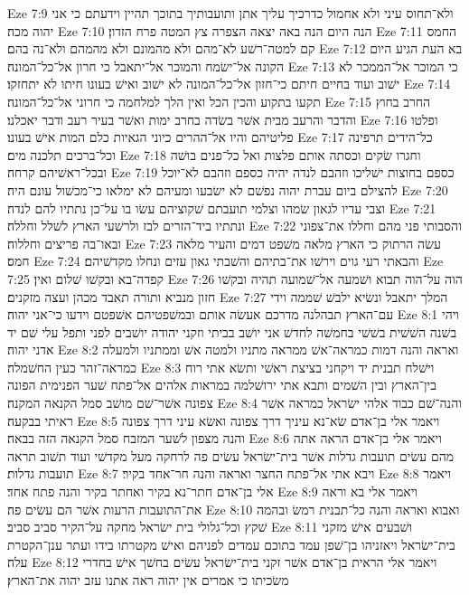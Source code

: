 Eze 7:9  ולא־תחוס עיני ולא אחמול כדרכיך עליך אתן ותועבותיך בתוכך תהיין וידעתם כי אני יהוה מכה׃
Eze 7:10  הנה היום הנה באה יצאה הצפרה צץ המטה פרח הזדון׃
Eze 7:11  החמס קם למטה־רשׁע לא־מהם ולא מהמונם ולא מהמהם ולא־נה בהם׃
Eze 7:12  בא העת הגיע היום הקונה אל־ישׂמח והמוכר אל־יתאבל כי חרון אל־כל־המונה׃
Eze 7:13  כי המוכר אל־הממכר לא ישׁוב ועוד בחיים חיתם כי־חזון אל־כל־המונה לא ישׁוב ואישׁ בעונו חיתו לא יתחזקו׃
Eze 7:14  תקעו בתקוע והכין הכל ואין הלך למלחמה כי חרוני אל־כל־המונה׃
Eze 7:15  החרב בחוץ והדבר והרעב מבית אשׁר בשׂדה בחרב ימות ואשׁר בעיר רעב ודבר יאכלנו׃
Eze 7:16  ופלטו פליטיהם והיו אל־ההרים כיוני הגאיות כלם המות אישׁ בעונו׃
Eze 7:17  כל־הידים תרפינה וכל־ברכים תלכנה מים׃
Eze 7:18  וחגרו שׂקים וכסתה אותם פלצות ואל כל־פנים בושׁה ובכל־ראשׁיהם קרחה׃
Eze 7:19  כספם בחוצות ישׁליכו וזהבם לנדה יהיה כספם וזהבם לא־יוכל להצילם ביום עברת יהוה נפשׁם לא ישׂבעו ומעיהם לא ימלאו כי־מכשׁול עונם היה׃
Eze 7:20  וצבי עדיו לגאון שׂמהו וצלמי תועבתם שׁקוציהם עשׂו בו על־כן נתתיו להם לנדה׃
Eze 7:21  ונתתיו ביד־הזרים לבז ולרשׁעי הארץ לשׁלל וחללה׃
Eze 7:22  והסבותי פני מהם וחללו את־צפוני ובאו־בה פריצים וחללוה׃
Eze 7:23  עשׂה הרתוק כי הארץ מלאה משׁפט דמים והעיר מלאה חמס׃
Eze 7:24  והבאתי רעי גוים וירשׁו את־בתיהם והשׁבתי גאון עזים ונחלו מקדשׁיהם׃
Eze 7:25  קפדה־בא ובקשׁו שׁלום ואין׃
Eze 7:26  הוה על־הוה תבוא ושׁמעה אל־שׁמועה תהיה ובקשׁו חזון מנביא ותורה תאבד מכהן ועצה מזקנים׃
Eze 7:27  המלך יתאבל ונשׂיא ילבשׁ שׁממה וידי עם־הארץ תבהלנה מדרכם אעשׂה אותם ובמשׁפטיהם אשׁפטם וידעו כי־אני יהוה׃
Eze 8:1  ויהי בשׁנה השׁשׁית בשׁשׁי בחמשׁה לחדשׁ אני יושׁב בביתי וזקני יהודה יושׁבים לפני ותפל עלי שׁם יד אדני יהוה׃
Eze 8:2  ואראה והנה דמות כמראה־אשׁ ממראה מתניו ולמטה אשׁ וממתניו ולמעלה כמראה־זהר כעין החשׁמלה׃
Eze 8:3  וישׁלח תבנית יד ויקחני בציצת ראשׁי ותשׂא אתי רוח בין־הארץ ובין השׁמים ותבא אתי ירושׁלמה במראות אלהים אל־פתח שׁער הפנימית הפונה צפונה אשׁר־שׁם מושׁב סמל הקנאה המקנה׃
Eze 8:4  והנה־שׁם כבוד אלהי ישׂראל כמראה אשׁר ראיתי בבקעה׃
Eze 8:5  ויאמר אלי בן־אדם שׂא־נא עיניך דרך צפונה ואשׂא עיני דרך צפונה והנה מצפון לשׁער המזבח סמל הקנאה הזה בבאה׃
Eze 8:6  ויאמר אלי בן־אדם הראה אתה מהם עשׂים תועבות גדלות אשׁר בית־ישׂראל עשׂים פה לרחקה מעל מקדשׁי ועוד תשׁוב תראה תועבות גדלות׃
Eze 8:7  ויבא אתי אל־פתח החצר ואראה והנה חר־אחד בקיר׃
Eze 8:8  ויאמר אלי בן־אדם חתר־נא בקיר ואחתר בקיר והנה פתח אחד׃
Eze 8:9  ויאמר אלי בא וראה את־התועבות הרעות אשׁר הם עשׂים פה׃
Eze 8:10  ואבוא ואראה והנה כל־תבנית רמשׂ ובהמה שׁקץ וכל־גלולי בית ישׂראל מחקה על־הקיר סביב סביב׃
Eze 8:11  ושׁבעים אישׁ מזקני בית־ישׂראל ויאזניהו בן־שׁפן עמד בתוכם עמדים לפניהם ואישׁ מקטרתו בידו ועתר ענן־הקטרת עלה׃
Eze 8:12  ויאמר אלי הראית בן־אדם אשׁר זקני בית־ישׂראל עשׂים בחשׁך אישׁ בחדרי משׂכיתו כי אמרים אין יהוה ראה אתנו עזב יהוה את־הארץ׃
